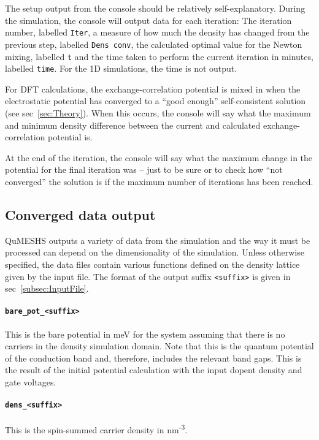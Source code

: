 \documentclass[12pt]{article}
\begin{document}
The setup output from the console should be relatively self-explanatory.  During the simulation,
the console will output data for each iteration:  The iteration number, labelled \texttt{Iter},
a measure of how much the density has changed from the previous step, labelled \texttt{Dens conv},
the calculated optimal value for the Newton mixing, labelled \texttt{t} and the time taken to
perform the current iteration in minutes, labelled \texttt{time}.  For the 1D simulations, the
time is not output.

For DFT calculations, the exchange-correlation potential is mixed in when the electrostatic
potential has converged to a ``good enough'' self-consistent solution (see
sec~\ref{sec:Theory}).  When this occurs, the console will say what the maximum
and minimum density difference between the current and calculated exchange-correlation potential
is.

At the end of the iteration, the console will say what the maximum change in the potential for
the final iteration was -- just to be sure or to check how ``not converged'' the solution is
if the maximum number of iterations has been reached.


\subsection{Converged data output}
\label{subsec:DataOutput}

QuMESHS outputs a variety of data from the simulation and the way it must be processed can
depend on the dimensionality of the simulation.  Unless otherwise specified, the data
files contain various functions defined on the density lattice given by the input file.
The format of the output suffix \texttt{<suffix>} is given in sec~\ref{subsec:InputFile}.

\paragraph{\texttt{bare\_pot\_<suffix>}}
This is the bare potential in meV for the system assuming that there is no carriers in
the density simulation domain.  Note that this is the quantum potential of the conduction
band and, therefore, includes the relevant band gaps.  This is the result of the initial
potential calculation with the input dopent density and gate voltages.

\paragraph{\texttt{dens\_<suffix>}}
This is the spin-summed carrier density in nm\textsuperscript{-3}.
\end{document}
